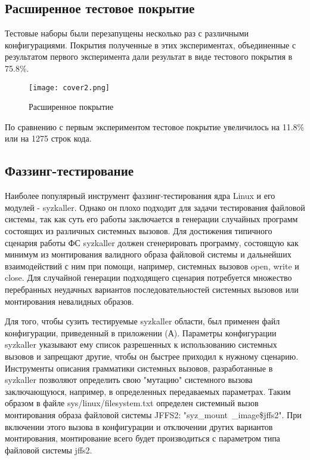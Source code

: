 \subsection{Расширенное тестовое покрытие}

Тестовые наборы были перезапущены несколько раз с различными конфигурациями. Покрытия полученные в этих экспериментах, объединенные с результатом первого эксперимента дали результат в виде тестового покрытия в 75.8\%.

\begin{figure}[H]
	\centering
	\texttt{[image: cover2.png]}
	\caption{Расширенное покрытие}
	\label{cover2}
\end{figure}

По сравнению с первым экспериментом тестовое покрытие увеличилось на 11.8\% или на 1275 строк кода.

\subsection{Фаззинг-тестирование}

Наиболее популярный инструмент фаззинг-тестирования ядра Linux и его модулей - syzkaller. Однако он плохо подходит для задачи тестирования файловой системы, так как суть его работы заключается в генерации случайных программ состоящих из различных системных вызовов. Для достижения типичного сценария работы ФС syzkaller должен сгенерировать программу, состоящую как минимум из монтирования валидного образа файловой системы и дальнейших взаимодействий с ним при помощи, например, системных вызовов open, write и close. Для случайной генерации подходящего сценария потребуется множество перебранных неудачных вариантов последовательностей системных вызовов или монтирования невалидных образов.

Для того, чтобы сузить тестируемые syzkaller области, был применен файл конфигурации, приведенный в приложении (А). Параметры конфигурации syzkaller указывают ему список разрешенных к использованию системных вызовов и запрещают другие, чтобы он быстрее приходил к нужному сценарию. Инструменты описания грамматики системных вызовов, разработанные в syzkaller позволяют определить свою "мутацию" системного вызова заключающуюся, например, в определенных передаваемых параметрах. Таким образом в файле sys/linux/filesystem.txt определен системный вызов монтирования образа файловой системы JFFS2: "syz\_mount\ \_image\$jffs2". При включении этого вызова в конфигурации и отключении других вариантов монтирования, монтирование всего будет производиться с параметром типа файловой системы jffs2.

